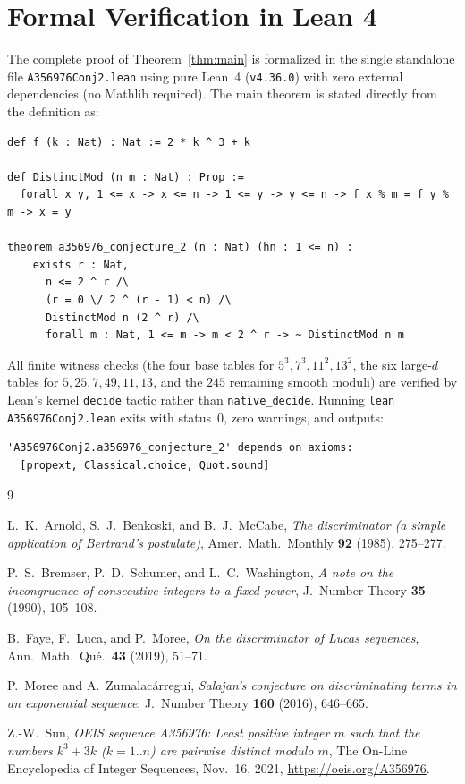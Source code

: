 \documentclass[11pt,reqno]{amsart}
\theoremstyle{remark}
\begin{document}
\section{Formal Verification in Lean 4}

The complete proof of Theorem~\ref{thm:main} is formalized in the single standalone file \texttt{A356976Conj2.lean} using pure Lean~4 (\texttt{v4.36.0}) with zero external dependencies (no Mathlib required). The main theorem is stated directly from the definition as:
\begin{verbatim}
def f (k : Nat) : Nat := 2 * k ^ 3 + k

def DistinctMod (n m : Nat) : Prop :=
  forall x y, 1 <= x -> x <= n -> 1 <= y -> y <= n -> f x % m = f y % m -> x = y

theorem a356976_conjecture_2 (n : Nat) (hn : 1 <= n) :
    exists r : Nat,
      n <= 2 ^ r /\
      (r = 0 \/ 2 ^ (r - 1) < n) /\
      DistinctMod n (2 ^ r) /\
      forall m : Nat, 1 <= m -> m < 2 ^ r -> ~ DistinctMod n m
\end{verbatim}
All finite witness checks (the four base tables for $5^3, 7^3, 11^2, 13^2$, the six large-$d$ tables for $5, 25, 7, 49, 11, 13$, and the $245$ remaining smooth moduli) are verified by Lean's kernel \texttt{decide} tactic rather than \texttt{native\_decide}. Running \texttt{lean A356976Conj2.lean} exits with status~$0$, zero warnings, and outputs:
\begin{verbatim}
'A356976Conj2.a356976_conjecture_2' depends on axioms:
  [propext, Classical.choice, Quot.sound]
\end{verbatim}

\begin{thebibliography}{9}

L.~K.~Arnold, S.~J.~Benkoski, and B.~J.~McCabe,
\emph{The discriminator (a simple application of Bertrand's postulate)},
Amer.\ Math.\ Monthly \textbf{92} (1985), 275--277.

\bibitem{BSW1990}
P.~S.~Bremser, P.~D.~Schumer, and L.~C.~Washington,
\emph{A note on the incongruence of consecutive integers to a fixed power},
J.\ Number Theory \textbf{35} (1990), 105--108.

\bibitem{FLM2019}
B.~Faye, F.~Luca, and P.~Moree,
\emph{On the discriminator of Lucas sequences},
Ann.\ Math.\ Qu\'e.\ \textbf{43} (2019), 51--71.

\bibitem{MZ2016}
P.~Moree and A.~Zumalac\'arregui,
\emph{Salajan's conjecture on discriminating terms in an exponential sequence},
J.\ Number Theory \textbf{160} (2016), 646--665.

\bibitem{SunA356976}
Z.-W.~Sun,
\emph{OEIS sequence A356976: Least positive integer $m$ such that the numbers $k^3 + 3k$ ($k = 1..n$) are pairwise distinct modulo $m$},
The On-Line Encyclopedia of Integer Sequences, Nov.\ 16, 2021, \url{https://oeis.org/A356976}.

\end{thebibliography}
\end{document}
